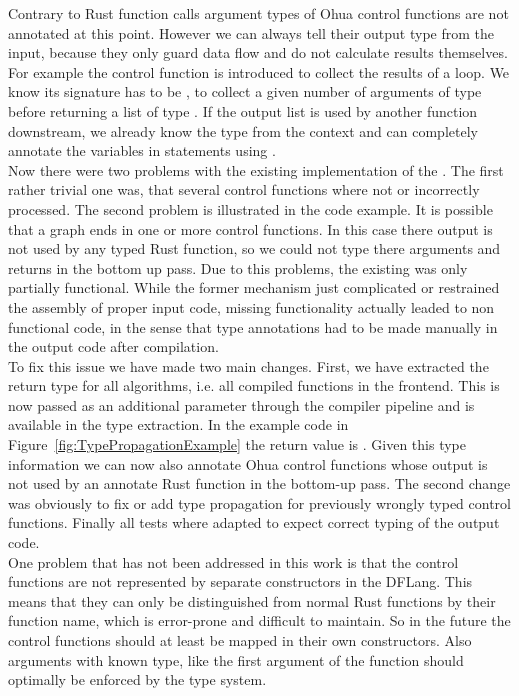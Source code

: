 Contrary to Rust function calls argument types of Ohua control functions are not annotated at this point. However we can always tell their output type from the input, because they only guard data flow and do not calculate results themselves. For example the  control function is introduced to collect the results of a loop. We know its signature has to be , to collect a given number of arguments of type  before returning a list of type \code{[A]}. If the output list is used by another function downstream, we already know the type  from the context and can completely annotate the variables in statements using .\\

Now there were two problems with the existing implementation of the . The first rather trivial one was, that several control functions where not or incorrectly processed. The second problem is illustrated in the  code example. It is possible that a graph ends in one or more control functions. In this case there output is not used by any typed Rust function, so we could not type there arguments and returns in the bottom up pass. Due to this problems, the existing  was only partially functional. While the former  mechanism just complicated or restrained the assembly of proper input code, missing  functionality actually leaded to non functional code, in the sense that type annotations had to be made manually in the output code after compilation.  \\

To fix this issue we have made two main changes. First, we have extracted the return type for all algorithms, i.e. all compiled functions in the frontend. This is now passed as an additional parameter through the compiler pipeline and is available in the type extraction. In the example code in Figure~\ref{fig:TypePropagationExample} the return value is . Given this type information we can now also annotate Ohua control functions whose output is not used by an annotate Rust function in the bottom-up pass. The second change was obviously to fix or add type propagation for previously wrongly typed control functions. Finally all tests where adapted to expect correct typing of the output code. \\

One problem that has not been addressed in this work is that the control functions are not represented by separate constructors in the DFLang. This means that they can only be distinguished from normal Rust functions by their function name, which is error-prone and difficult to maintain. So in the future the control functions should at least be mapped in their own constructors. Also arguments with known type, like the first argument of the function  should optimally be enforced by the type system. 


